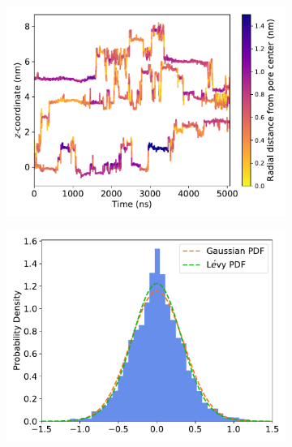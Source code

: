 \documentclass{article}
\begin{document}
  \begin{figure}
  \centering
  \begin{subfigure}{0.45\textwidth}
  \includegraphics[width=\textwidth]{URE_trajectories.pdf}
  \caption{}\label{fig:solute_trajectories}
  \end{subfigure}
  \begin{subfigure}{0.45\textwidth}
  \includegraphics[width=\textwidth]{gaussian_levy_comparison_anomalous_GCL.pdf}
  \caption{}\label{fig:hop_distribution_comparison}
  \end{subfigure}

\end{figure}
\end{document}
